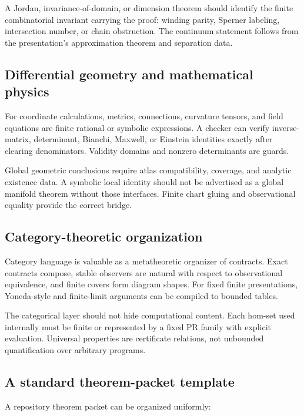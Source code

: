 A Jordan, invariance-of-domain, or dimension theorem should identify the finite combinatorial invariant carrying the proof: winding parity, Sperner labeling, intersection number, or chain obstruction.  The continuum statement follows from the presentation's approximation theorem and separation data.

\subsection{Differential geometry and mathematical physics}

For coordinate calculations, metrics, connections, curvature tensors, and field equations are finite rational or symbolic expressions.  A checker can verify inverse-matrix, determinant, Bianchi, Maxwell, or Einstein identities exactly after clearing denominators.  Validity domains and nonzero determinants are guards.

Global geometric conclusions require atlas compatibility, coverage, and analytic existence data.  A symbolic local identity should not be advertised as a global manifold theorem without those interfaces.  Finite chart gluing and observational equality provide the correct bridge.

\subsection{Category-theoretic organization}

Category language is valuable as a metatheoretic organizer of contracts.  Exact contracts compose, stable observers are natural with respect to observational equivalence, and finite covers form diagram shapes.  For fixed finite presentations, Yoneda-style and finite-limit arguments can be compiled to bounded tables.

The categorical layer should not hide computational content.  Each hom-set used internally must be finite or represented by a fixed PR family with explicit evaluation.  Universal properties are certificate relations, not unbounded quantification over arbitrary programs.

\subsection{A standard theorem-packet template}

A repository theorem packet can be organized uniformly:

